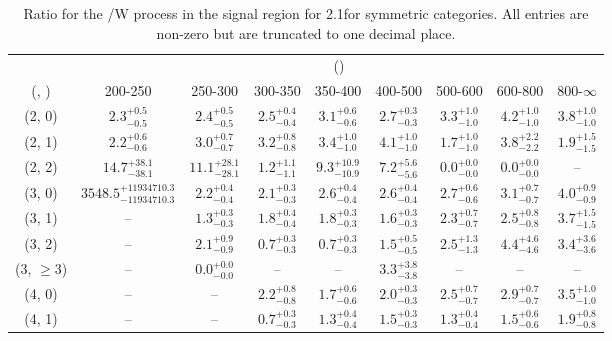 \begin{table}[h!]
\tiny
\centering
\caption{Ratio for the \ttbar/W process in the signal region for 2.1\ifb for symmetric categories. All entries are non-zero but are truncated to one decimal place.\label{tab:ratiosep_sig_ttw_sym}}
\begin{tabular}
{ccccccccc}
	\hline\hline
	& \multicolumn{8}{c}{\scalht (\gev)} \\ 
	 (\njet,  \nb) & 200-250 & 250-300 & 300-350 & 350-400 & 400-500 & 500-600 & 600-800 & 800-$\infty$ \\ [0.8ex] 
\hline
	(2, 0) & $2.3^{+ 0.5 }_{- 0.5 }$ & $2.4^{+ 0.5 }_{- 0.5 }$ & $2.5^{+ 0.4 }_{- 0.4 }$ & $3.1^{+ 0.6 }_{- 0.6 }$ & $2.7^{+ 0.3 }_{- 0.3 }$ & $3.3^{+ 1.0 }_{- 1.0 }$ & $4.2^{+ 1.0 }_{- 1.0 }$ & $3.8^{+ 1.0 }_{- 1.0 }$ \\[0.5ex] 
	(2, 1) & $2.2^{+ 0.6 }_{- 0.6 }$ & $3.0^{+ 0.7 }_{- 0.7 }$ & $3.2^{+ 0.8 }_{- 0.8 }$ & $3.4^{+ 1.0 }_{- 1.0 }$ & $4.1^{+ 1.0 }_{- 1.0 }$ & $1.7^{+ 1.0 }_{- 1.0 }$ & $3.8^{+ 2.2 }_{- 2.2 }$ & $1.9^{+ 1.5 }_{- 1.5 }$ \\[0.5ex] 
	(2, 2) & $14.7^{+ 38.1 }_{- 38.1 }$ & $11.1^{+ 28.1 }_{- 28.1 }$ & $1.2^{+ 1.1 }_{- 1.1 }$ & $9.3^{+ 10.9 }_{- 10.9 }$ & $7.2^{+ 5.6 }_{- 5.6 }$ & $0.0^{+ 0.0 }_{- 0.0 }$ & $0.0^{+ 0.0 }_{- 0.0 }$ & -- \\[0.5ex] 
	(3, 0) & $3548.5^{+ 11934710.3 }_{- 11934710.3 }$ & $2.2^{+ 0.4 }_{- 0.4 }$ & $2.1^{+ 0.3 }_{- 0.3 }$ & $2.6^{+ 0.4 }_{- 0.4 }$ & $2.6^{+ 0.4 }_{- 0.4 }$ & $2.7^{+ 0.6 }_{- 0.6 }$ & $3.1^{+ 0.7 }_{- 0.7 }$ & $4.0^{+ 0.9 }_{- 0.9 }$ \\[0.5ex] 
	(3, 1) & -- & $1.3^{+ 0.3 }_{- 0.3 }$ & $1.8^{+ 0.4 }_{- 0.4 }$ & $1.8^{+ 0.3 }_{- 0.3 }$ & $1.6^{+ 0.3 }_{- 0.3 }$ & $2.3^{+ 0.7 }_{- 0.7 }$ & $2.5^{+ 0.8 }_{- 0.8 }$ & $3.7^{+ 1.5 }_{- 1.5 }$ \\[0.5ex] 
	(3, 2) & -- & $2.1^{+ 0.9 }_{- 0.9 }$ & $0.7^{+ 0.3 }_{- 0.3 }$ & $0.7^{+ 0.3 }_{- 0.3 }$ & $1.5^{+ 0.5 }_{- 0.5 }$ & $2.5^{+ 1.3 }_{- 1.3 }$ & $4.4^{+ 4.6 }_{- 4.6 }$ & $3.4^{+ 3.6 }_{- 3.6 }$ \\[0.5ex] 
	(3, $\ge3$) & -- & $0.0^{+ 0.0 }_{- 0.0 }$ & -- & -- & $3.3^{+ 3.8 }_{- 3.8 }$ & -- & -- & -- \\[0.5ex] 
	(4, 0) & -- & -- & $2.2^{+ 0.8 }_{- 0.8 }$ & $1.7^{+ 0.6 }_{- 0.6 }$ & $2.0^{+ 0.3 }_{- 0.3 }$ & $2.5^{+ 0.7 }_{- 0.7 }$ & $2.9^{+ 0.7 }_{- 0.7 }$ & $3.5^{+ 1.0 }_{- 1.0 }$ \\[0.5ex] 
	(4, 1) & -- & -- & $0.7^{+ 0.3 }_{- 0.3 }$ & $1.3^{+ 0.4 }_{- 0.4 }$ & $1.5^{+ 0.3 }_{- 0.3 }$ & $1.3^{+ 0.4 }_{- 0.4 }$ & $1.5^{+ 0.6 }_{- 0.6 }$ & $1.9^{+ 0.8 }_{- 0.8 }$ \\[0.5ex] 

\end{tabular}
\end{table}
